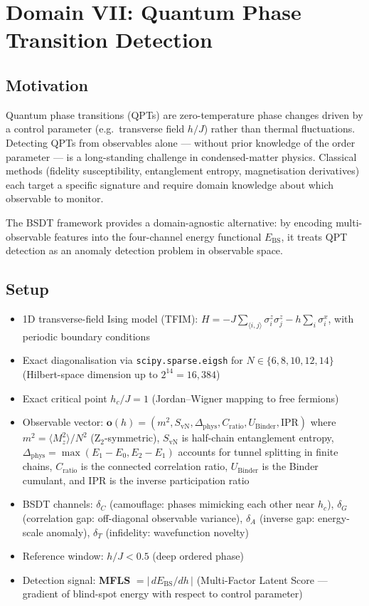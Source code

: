 \documentclass[11pt,a4paper]{article}
\newcommand{\Ebs}{E_{\mathrm{BS}}}
\begin{document}
\section{Domain VII: Quantum Phase Transition Detection}\label{sec:qpt}

\subsection{Motivation}
Quantum phase transitions (QPTs) are zero-temperature phase changes
driven by a control parameter (e.g.\ transverse field $h/J$) rather
than thermal fluctuations.  Detecting QPTs from observables alone ---
without prior knowledge of the order parameter --- is a long-standing
challenge in condensed-matter physics.  Classical methods (fidelity
susceptibility, entanglement entropy, magnetisation derivatives) each
target a specific signature and require domain knowledge about which
observable to monitor.

The BSDT framework provides a domain-agnostic alternative: by encoding
multi-observable features into the four-channel energy functional
$\Ebs$, it treats QPT detection as an anomaly detection problem in
observable space.

\subsection{Setup}
\begin{itemize}[nosep]
  \item 1D transverse-field Ising model (TFIM):
        $H = -J\sum_{\langle i,j\rangle} \sigma^z_i \sigma^z_j
        - h\sum_i \sigma^x_i$, with periodic boundary conditions
  \item Exact diagonalisation via \texttt{scipy.sparse.eigsh} for
        $N \in \{6, 8, 10, 12, 14\}$ (Hilbert-space dimension up to $2^{14}=16{,}384$)
  \item Exact critical point $h_c/J = 1$ (Jordan--Wigner mapping to free fermions)
  \item Observable vector: $\mathbf{o}(h) = (m^2, S_{\mathrm{vN}},
        \Delta_{\mathrm{phys}}, C_{\mathrm{ratio}}, U_{\mathrm{Binder}},
        \mathrm{IPR})$ where $m^2 = \langle M_z^2\rangle / N^2$
        (Z$_2$-symmetric), $S_{\mathrm{vN}}$ is half-chain entanglement
        entropy, $\Delta_{\mathrm{phys}} = \max(E_1 - E_0, E_2 - E_1)$
        accounts for tunnel splitting in finite chains, $C_{\mathrm{ratio}}$
        is the connected correlation ratio, $U_{\mathrm{Binder}}$ is the
        Binder cumulant, and IPR is the inverse participation ratio
  \item BSDT channels: $\delta_C$ (camouflage: phases mimicking each
        other near $h_c$), $\delta_G$ (correlation gap: off-diagonal
        observable variance), $\delta_A$ (inverse gap: energy-scale
        anomaly), $\delta_T$ (infidelity: wavefunction novelty)
  \item Reference window: $h/J < 0.5$ (deep ordered phase)
  \item Detection signal: \textbf{MFLS} $= |\,d\Ebs / dh\,|$
        (Multi-Factor Latent Score --- gradient of blind-spot energy with
        respect to control parameter)
\end{itemize}
\end{document}
